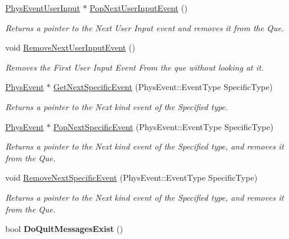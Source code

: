 \begin{DoxyCompactItemize}
\hyperlink{classPhysEventUserInput}{PhysEventUserInput} $\ast$ \hyperlink{classPhysEventManager_ad6612a6e1c728941e2c467e7f136ca51}{PopNextUserInputEvent} ()
\begin{DoxyCompactList}\small\item\em Returns a pointer to the Next User Input event and removes it from the Que. \item\end{DoxyCompactList}\item 
void \hyperlink{classPhysEventManager_a9c6f5296c9961fa469ebe06d7599283a}{RemoveNextUserInputEvent} ()
\begin{DoxyCompactList}\small\item\em Removes the First User Input Event From the que without looking at it. \item\end{DoxyCompactList}\item 
\hyperlink{classPhysEvent}{PhysEvent} $\ast$ \hyperlink{classPhysEventManager_a56e45572c2fb84131f7d55c060c7ac21}{GetNextSpecificEvent} (PhysEvent::EventType SpecificType)
\begin{DoxyCompactList}\small\item\em Returns a pointer to the Next kind event of the Specified type. \item\end{DoxyCompactList}\item 
\hyperlink{classPhysEvent}{PhysEvent} $\ast$ \hyperlink{classPhysEventManager_abce156f7ad7ab145b8b05740b48e6073}{PopNextSpecificEvent} (PhysEvent::EventType SpecificType)
\begin{DoxyCompactList}\small\item\em Returns a pointer to the Next kind event of the Specified type, and removes it from the Que. \item\end{DoxyCompactList}\item 
void \hyperlink{classPhysEventManager_a2d0c21e369d16cd2de97eb4c69003323}{RemoveNextSpecificEvent} (PhysEvent::EventType SpecificType)
\begin{DoxyCompactList}\small\item\em Returns a pointer to the Next kind event of the Specified type, and removes it from the Que. \item\end{DoxyCompactList}\item 
\hypertarget{classPhysEventManager_a77b22f706d22914602982cbcaf05bba9}{
bool {\bfseries DoQuitMessagesExist} ()}
\label{d5/dd7/classPhysEventManager_a77b22f706d22914602982cbcaf05bba9}


\end{DoxyCompactItemize}
